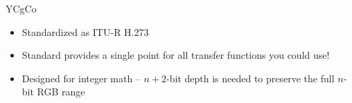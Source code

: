 \documentclass[aspectratio=169,handout,usepdftitle=false]{fireshonks}
\begin{document}
\begin{frame}{YCgCo}
    \begin{itemize}
        \item Standardized as ITU-R H.273 \parencite*{ycocg}
        \item Standard provides a single point for all transfer functions you could use!
        \item Designed for integer math -- $n+2$-bit depth is needed to preserve the full $n$-bit RGB range
    \end{itemize}

\end{frame}
\end{document}
